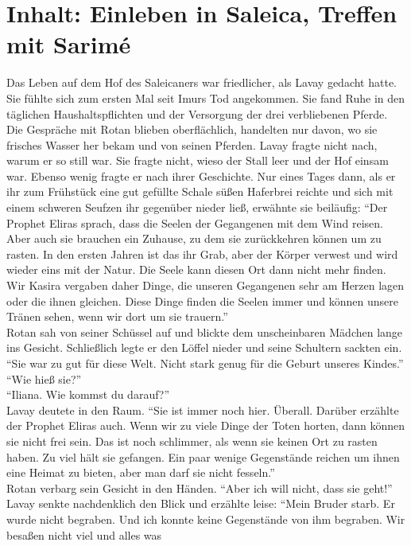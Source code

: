 \chapter{Inhalt: Einleben in Saleica, Treffen mit Sarimé}

Das Leben auf dem Hof des Saleicaners war friedlicher, als Lavay gedacht hatte. Sie fühlte sich zum 
ersten Mal seit Imurs Tod angekommen. Sie fand Ruhe in den täglichen Haushaltspflichten und der 
Versorgung der drei verbliebenen Pferde. Die Gespräche mit Rotan blieben oberflächlich, handelten 
nur davon, wo sie frisches Wasser her bekam und von seinen Pferden. Lavay fragte nicht nach, warum 
er so still war. Sie fragte nicht, wieso der Stall leer und der Hof einsam war. Ebenso wenig fragte 
er nach ihrer Geschichte. Nur eines Tages dann, als er ihr zum Frühstück eine gut gefüllte Schale 
süßen Haferbrei reichte und sich mit einem schweren Seufzen ihr gegenüber nieder ließ, erwähnte sie 
beiläufig: ``Der Prophet Eliras sprach, dass die Seelen der Gegangenen mit dem Wind reisen. Aber 
auch sie brauchen ein Zuhause, zu dem sie zurückkehren können um zu rasten. In den ersten Jahren 
ist das ihr Grab, aber der Körper verwest und wird wieder eins mit der Natur. Die Seele kann diesen 
Ort dann nicht mehr finden. Wir Kasira vergaben daher Dinge, die unseren Gegangenen sehr am Herzen 
lagen oder die ihnen gleichen. Diese Dinge finden die Seelen immer und können unsere Tränen sehen, 
wenn wir dort um sie trauern.''\\
Rotan sah von seiner Schüssel auf und blickte dem unscheinbaren Mädchen lange ins Gesicht. 
Schließlich legte er den Löffel nieder und seine Schultern sackten ein. ``Sie war zu gut für diese 
Welt. Nicht stark genug für die Geburt unseres Kindes.''\\
``Wie hieß sie?''\\
``Iliana. Wie kommst du darauf?''\\
Lavay deutete in den Raum. ``Sie ist immer noch hier. Überall. Darüber erzählte der Prophet Eliras 
auch. Wenn wir zu viele Dinge der Toten horten, dann können sie nicht frei sein. Das ist noch 
schlimmer, als wenn sie keinen Ort zu rasten haben. Zu viel hält sie gefangen. Ein paar wenige 
Gegenstände reichen um ihnen eine Heimat zu bieten, aber man darf sie nicht fesseln.''\\
Rotan verbarg sein Gesicht in den Händen. ``Aber ich will nicht, dass sie geht!''\\
Lavay senkte nachdenklich den Blick und erzählte leise: ``Mein Bruder starb. Er wurde nicht 
begraben. Und ich konnte keine Gegenstände von ihm begraben. Wir besaßen nicht viel und alles was 
